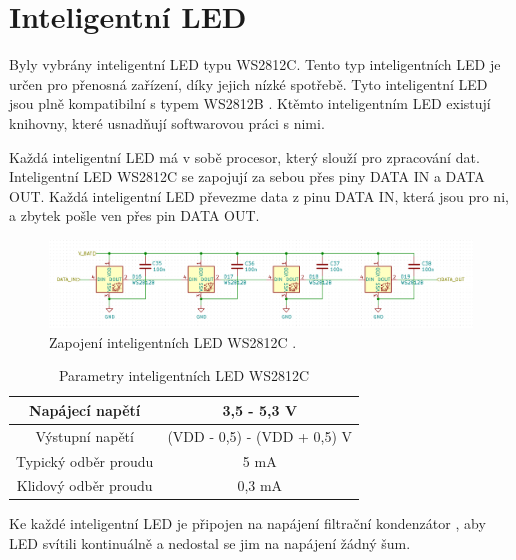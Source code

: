 \section{Inteligentní LED}
Byly vybrány inteligentní LED typu WS2812C. Tento typ inteligentních LED je určen pro přenosná zařízení, díky jejich nízké 
spotřebě. Tyto inteligentní LED jsou plně kompatibilní s typem WS2812B \cite{WS2812C_datasheet}. Ktěmto inteligentním LED 
existují knihovny, které usnadňují softwarovou práci s nimi.

Každá inteligentní LED má v sobě procesor, který slouží pro zpracování dat. 
Inteligentní LED WS2812C se zapojují za sebou přes piny DATA IN a DATA OUT. Každá inteligentní LED převezme data z pinu DATA IN, která jsou 
pro ni, a zbytek pošle ven přes pin DATA OUT.

\begin{figure}[!h]
    \begin{center}
      \includegraphics[scale=0.5]{obrazky/WS2812C_spojeni.png}
    \end{center}
    \caption[Zapojení inteligentních LED WS2812C]{Zapojení inteligentních LED WS2812C \cite{WS2812C_datasheet}.}
\end{figure}

\begin{table}[!h]
  \caption{Parametry inteligentních LED WS2812C \cite{WS2812C_datasheet}}
  \begin{center}
      \begin{tabular}{|c|c|}
          \hline
          Napájecí napětí   & 3,5 - 5,3 V \\
          \hline
          Výstupní napětí   & (VDD - 0,5) - (VDD + 0,5) V \\
          \hline
          Typický odběr proudu & 5 mA \\
          \hline
          Klidový odběr proudu & 0,3 mA \\
          \hline
      \end{tabular}    
  \end{center}
\end{table}

Ke každé inteligentní LED je připojen na napájení filtrační kondenzátor \cite{WS2812C_datasheet}, aby LED svítili kontinuálně 
a nedostal se jim na napájení žádný šum.

